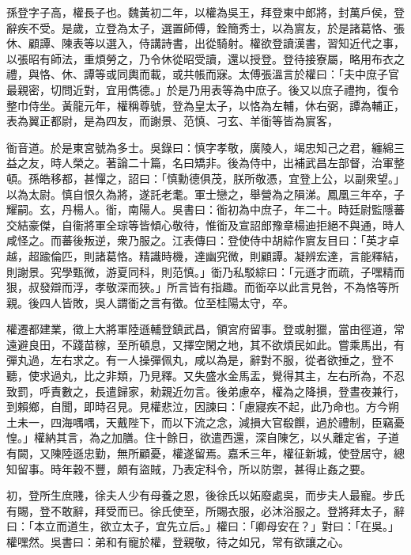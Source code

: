 
\begin{pinyinscope}
孫登字子高，權長子也。魏黃初二年，以權為吳王，拜登東中郎將，封萬戶侯，登辭疾不受。是歲，立登為太子，選置師傅，銓簡秀士，以為賔友，於是諸葛恪、張休、顧譚、陳表等以選入，侍講詩書，出從騎射。權欲登讀漢書，習知近代之事，以張昭有師法，重煩勞之，乃令休從昭受讀，還以授登。登待接寮屬，略用布衣之禮，與恪、休、譚等或同輿而載，或共帳而寐。太傅張溫言於權曰：「夫中庶子官最親密，切問近對，宜用儁德。」於是乃用表等為中庶子。後又以庶子禮拘，復令整巾侍坐。黃龍元年，權稱尊號，登為皇太子，以恪為左輔，休右弼，譚為輔正，表為翼正都尉，是為四友，而謝景、范慎、刁玄、羊衜等皆為賔客，

衜音道。於是東宮號為多士。吳錄曰：慎字孝敬，廣陵人，竭忠知己之君，纏綿三益之友，時人榮之。著論二十篇，名曰矯非。後為侍中，出補武昌左部督，治軍整頓。孫皓移都，甚憚之，詔曰：「慎勳德俱茂，朕所敬憑，宜登上公，以副衆望。」以為太尉。慎自恨久為將，遂託老耄。軍士戀之，舉營為之隕涕。鳳凰三年卒，子耀嗣。玄，丹楊人。衜，南陽人。吳書曰：衜初為中庶子，年二十。時廷尉監隱蕃交結豪傑，自衞將軍全琮等皆傾心敬待，惟衜及宣詔郎豫章楊迪拒絕不與通，時人咸怪之。而蕃後叛逆，衆乃服之。江表傳曰：登使侍中胡綜作賔友目曰：「英才卓越，超踰倫匹，則諸葛恪。精識時機，達幽究微，則顧譚。凝辨宏達，言能釋結，則謝景。究學甄微，游夏同科，則范慎。」衜乃私駁綜曰：「元遜才而疏，子嘿精而狠，叔發辯而浮，孝敬深而狹。」所言皆有指趣。而衜卒以此言見咎，不為恪等所親。後四人皆敗，吳人謂衜之言有徵。位至桂陽太守，卒。

權遷都建業，徵上大將軍陸遜輔登鎮武昌，領宮府留事。登或射獵，當由徑道，常遠避良田，不踐苗稼，至所頓息，又擇空閑之地，其不欲煩民如此。嘗乘馬出，有彈丸過，左右求之。有一人操彈佩丸，咸以為是，辭對不服，從者欲捶之，登不聽，使求過丸，比之非類，乃見釋。又失盛水金馬盂，覺得其主，左右所為，不忍致罰，呼責數之，長遣歸家，勑親近勿言。後弟慮卒，權為之降損，登晝夜兼行，到賴鄉，自聞，即時召見。見權悲泣，因諫曰：「慮寢疾不起，此乃命也。方今朔土未一，四海喁喁，天戴陛下，而以下流之念，減損大官殽饌，過於禮制，臣竊憂惶。」權納其言，為之加膳。住十餘日，欲遣西還，深自陳乞，以乆離定省，子道有闕，又陳陸遜忠勤，無所顧憂，權遂留焉。嘉禾三年，權征新城，使登居守，總知留事。時年穀不豐，頗有盜賊，乃表定科令，所以防禦，甚得止姦之要。

初，登所生庶賤，徐夫人少有母養之恩，後徐氏以妬廢處吳，而步夫人最寵。步氏有賜，登不敢辭，拜受而已。徐氏使至，所賜衣服，必沐浴服之。登將拜太子，辭曰：「本立而道生，欲立太子，宜先立后。」權曰：「卿母安在？」對曰：「在吳。」權嘿然。吳書曰：弟和有寵於權，登親敬，待之如兄，常有欲讓之心。


\end{pinyinscope}
